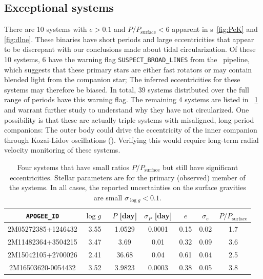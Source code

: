 \documentclass[modern, letterpaper]{aastex62}
\newcommand{\apogee}{\project{\acronym{APOGEE}}}
\newcommand{\logg}{\ensuremath{\log g}}
\newcommand{\Psurf}{\ensuremath{P_\textrm{surface}}}
\begin{document}
\subsection{Exceptional systems}

There are 10 systems with $e > 0.1$ and $P/\Psurf < 6$ apparent in \figurename
s~\ref{fig:PeK} and \ref{fig:dlne}.
These binaries have short periods and large eccentricities that appear to be
discrepant with our conclusions made about tidal circularization.
Of these 10 systems, 6 have the warning flag \texttt{SUSPECT\_BROAD\_LINES} from
the \apogee\ pipeline, which suggests that these primary stars are either fast
rotators or may contain blended light from the companion star; The inferred
eccentricities for these systems may therefore be biased.
In total, 39 systems distributed over the full range of periods have this
warning flag.
The remaining 4 systems are listed in \tablename~\ref{tbl:except} and warrant
further study to understand why they have not circularized.
One possibility is that these are actually triple systems with misaligned,
long-period companions: The outer body could drive the eccentricity of the inner
companion through Kozai-Lidov oscillations (\citealt{Kozai:1962, Lidov:1962}).
Verifying this would require long-term radial velocity monitoring of these
systems.

\begin{table}[h]
    \centering
    \begin{tabular}{ c c c c c c c }
    \hline
    \texttt{APOGEE\_ID} & \logg\ & $P$ [day] & $\sigma_P$ [day] & $e$ & $\sigma_e$ & $P/\Psurf$ \\
    \hline
    2M05272385+1246432 & 3.55 & 1.0529 & 0.0001 & 0.15 & 0.02 & 1.7\\
    2M11482364+3504215 & 3.47 & 3.69   & 0.01   & 0.32 & 0.09 & 3.6\\
    2M15042105+2700026 & 2.41 & 36.68  & 0.04   & 0.61 & 0.04 & 2.5\\
    2M16503620-0054432 & 3.52 & 3.9823 & 0.0003 & 0.38 & 0.05 & 3.8\\
    \hline
    \end{tabular}
    \caption{Four systems that have small ratios $P/\Psurf$ but still have
    significant eccentricities.
    Stellar parameters are for the primary (observed) member of the systems.
    In all cases, the reported uncertainties on the surface gravities are small
    $\sigma_{\logg} < 0.1$.
    }
    \label{tbl:except}
\end{table}
\end{document}
